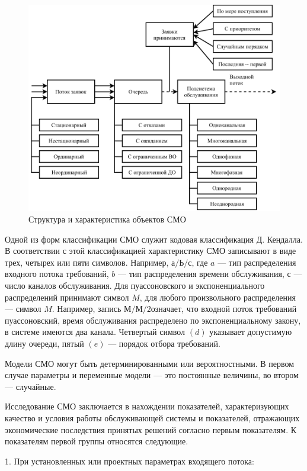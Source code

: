 \begin{figure}[!h]
	\centering
	\includegraphics{smo}
	\caption{Структура и характеристика объектов СМО}
	\label{fig:}
\end{figure}


Одной из форм классификации СМО служит кодовая классификация Д. Кендалла. В соответствии с этой классификацией характеристику СМО записывают в виде трех, четырех или пяти символов. Например, $ а/Ь/с $, где $ a $ --- тип распределения входного потока требований, $ b $ --- тип распределения времени обслуживания, $ с $ --- число каналов обслуживания. Для пуассоновского и экспоненциального распределений принимают символ $M$, для любого произвольного распределения --- символ $ M $. Например, запись $ М/М/2  $означает, что входной поток требований пуассоновский, время обслуживания распределено по экспоненциальному закону, в системе имеются два канала. Четвертый символ $ (d) $ указывает допустимую длину очереди, пятый $ (e) $ --- порядок отбора требований.

Модели СМО могут быть детерминированными или вероятностными. В первом случае параметры и переменные модели --- это постоянные величины, во втором --- случайные.

Исследование СМО заключается в нахождении показателей, характеризующих качество и условия работы обслуживающей системы и показателей, отражающих экономические последствия принятых решений согласно первым показателям. К показателям первой группы относятся следующие.

1. При установленных или проектных параметрах входящего потока:\\

